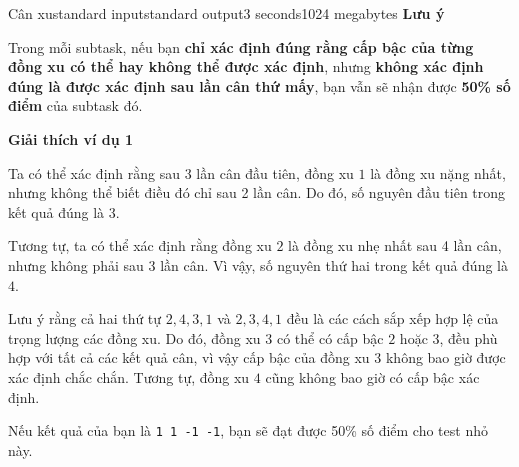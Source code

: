 \begin{problem}{Cân xu}{standard input}{standard output}{3 seconds}{1024 megabytes}
\textbf{Lưu ý}

Trong mỗi subtask, nếu bạn \textbf{chỉ xác định đúng rằng cấp bậc của từng đồng xu có thể hay không thể được xác định},  
nhưng \textbf{không xác định đúng là được xác định sau lần cân thứ mấy},  
bạn vẫn sẽ nhận được \textbf{50\% số điểm} của subtask đó.


\Examples

\begin{example}
%
%
\end{example}

\Note
\textbf{Giải thích ví dụ 1}

Ta có thể xác định rằng sau 3 lần cân đầu tiên, đồng xu $1$ là đồng xu nặng nhất, 
nhưng không thể biết điều đó chỉ sau 2 lần cân. 
Do đó, số nguyên đầu tiên trong kết quả đúng là $3$.

Tương tự, ta có thể xác định rằng đồng xu $2$ là đồng xu nhẹ nhất sau 4 lần cân, 
nhưng không phải sau 3 lần cân. 
Vì vậy, số nguyên thứ hai trong kết quả đúng là $4$.

Lưu ý rằng cả hai thứ tự $2,4,3,1$ và $2,3,4,1$ đều là các cách sắp xếp hợp lệ của trọng lượng các đồng xu.  
Do đó, đồng xu $3$ có thể có cấp bậc $2$ hoặc $3$, đều phù hợp với tất cả các kết quả cân, 
vì vậy cấp bậc của đồng xu $3$ không bao giờ được xác định chắc chắn.  
Tương tự, đồng xu $4$ cũng không bao giờ có cấp bậc xác định.

Nếu kết quả của bạn là \texttt{1 1 -1 -1}, bạn sẽ đạt được 50\% số điểm cho test nhỏ này.


\end{problem}

